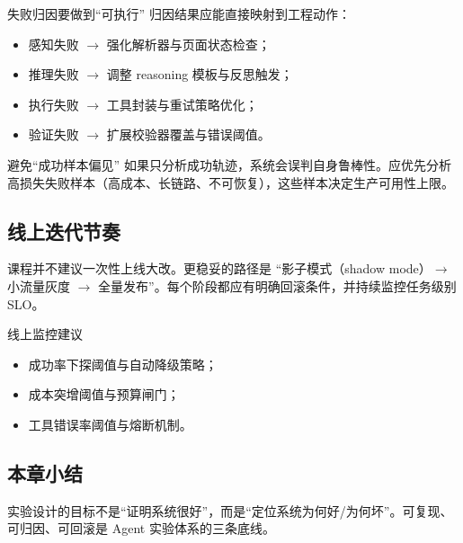 \begin{importantbox}{失败归因要做到“可执行”}
归因结果应能直接映射到工程动作：
\begin{itemize}
    \item 感知失败 $\rightarrow$ 强化解析器与页面状态检查；
    \item 推理失败 $\rightarrow$ 调整 reasoning 模板与反思触发；
    \item 执行失败 $\rightarrow$ 工具封装与重试策略优化；
    \item 验证失败 $\rightarrow$ 扩展校验器覆盖与错误阈值。
\end{itemize}
\end{importantbox}

\begin{warningbox}{避免“成功样本偏见”}
如果只分析成功轨迹，系统会误判自身鲁棒性。应优先分析高损失失败样本（高成本、长链路、不可恢复），这些样本决定生产可用性上限。
\end{warningbox}

\subsection{线上迭代节奏}
课程并不建议一次性上线大改。更稳妥的路径是 ``影子模式（shadow mode）$\rightarrow$ 小流量灰度 $\rightarrow$ 全量发布''。每个阶段都应有明确回滚条件，并持续监控任务级别 SLO。

\begin{knowledgebox}{线上监控建议}
\begin{itemize}
    \item 成功率下探阈值与自动降级策略；
    \item 成本突增阈值与预算闸门；
    \item 工具错误率阈值与熔断机制。
\end{itemize}
\end{knowledgebox}

\subsection{本章小结}
实验设计的目标不是“证明系统很好”，而是“定位系统为何好/为何坏”。可复现、可归因、可回滚是 Agent 实验体系的三条底线。

